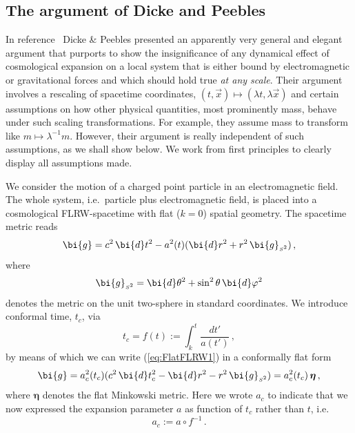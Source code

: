 \documentclass
[rmp,aps,twocolumn,showpacs,preprintnumbers,amsmath,amssymb]{revtex4}
\theoremstyle{plain}
\theoremstyle{definition}
\theoremstyle{remark}
\newcommand{\sss}{\scriptscriptstyle}
\newcommand{\ed}{\bi{d}}                      %
\newcommand{\Stwo}{{S^2}}                         %
\newcommand{\sStwo}{{\sss \Stwo}}                 %
\newcommand{\gStwo}{\g_\sStwo}                    %
\newcommand{\g}{\bg}                            %
\newcommand{\bg}{\bi{g}}
\newcommand{\bfeta}{\boldsymbol{\eta}}
\begin{document}
\subsection{The argument of Dicke and Peebles}
%
In reference~\cite{Dicke.Peebles:1964} Dicke \& Peebles presented 
an apparently very general and elegant argument that purports
to show the insignificance of any dynamical effect of cosmological 
expansion on a local system that is either bound by electromagnetic or 
gravitational forces and which should hold true \emph{at any scale}. 
Their argument involves a rescaling of spacetime 
coordinates, $(t,\vec x)\mapsto (\lambda t,\lambda\vec x)$ and 
certain assumptions on how other physical quantities, most prominently
mass, behave under such scaling transformations. For example, they 
assume mass to transform like $m\mapsto\lambda^{-1}m$. However, their 
argument is really independent of such assumptions, as we shall 
show below. We work from first principles to clearly display all 
assumptions made. 

We consider the motion of a charged point particle in an 
electromagnetic field. The whole system, i.e.~particle plus 
electromagnetic field, is placed into a cosmological FLRW-spacetime 
with flat ($k=0$) spatial geometry. The spacetime metric reads 
%
\begin{equation}
\label{eq:FlatFLRW1}
\g = c^2\, \ed t^2 - a^2(t) (\ed r^2 + r^2\,\gStwo )\,,
\end{equation}
%
where 
%
\begin{equation}\label{eq:Def-gStwo}
  \gStwo = \ed\theta^2 + \sin^2\theta\,\ed\varphi^2
\end{equation}
%
denotes the metric on the unit two-sphere in standard coordinates.
We introduce conformal time, $t_c$, via 
%
\begin{equation}\label{eq:ConfTime} 
  t_c=f(t):=\int^t_k\frac{dt'}{a(t')}\,,
\end{equation}
%
by means of which we can write (\ref{eq:FlatFLRW1}) in a
conformally flat form
%
\begin{equation}\label{eq:FlatFLRW2}
  \g = a_c^2(t_c) (c^2\,\ed t_c^2-\ed r^2-r^2\,\gStwo ) 
     = a_c^2(t_c)\,\bfeta \,,
\end{equation}
%
where $\bfeta$ denotes the flat Minkowski metric.
Here we wrote $a_c$ to indicate that we now expressed the expansion 
parameter $a$ as function of $t_c$ rather than $t$, i.e. 
%
\begin{equation}\label{eq:A-c}
  a_c:=a\circ f^{-1}\,.
\end{equation}
%
\end{document}
